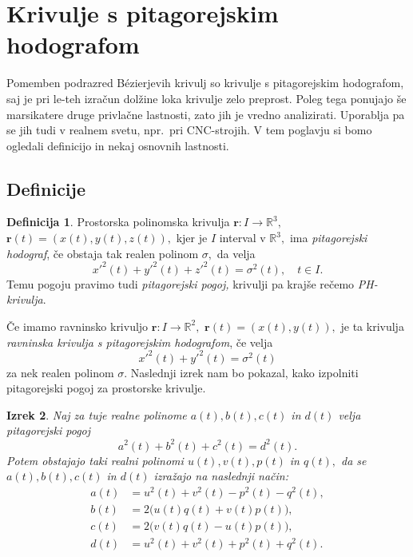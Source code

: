 \documentclass[12pt,a4paper,twoside]{article}
\theoremstyle{definition} %
\newtheorem{definicija}{Definicija}[section]
\theoremstyle{plain} %
\newtheorem{izrek}[definicija]{Izrek}
\theoremstyle{primerstyle}
\numberwithin{equation}{section}  %
\newcommand{\R}{\mathbb R}
\newcommand{\rV}{\mathbf{r}}
\begin{document}
\section{Krivulje s pitagorejskim hodografom}

Pomemben podrazred Bézierjevih krivulj so krivulje s pitagorejskim hodografom, saj je pri le-teh izračun dolžine loka krivulje zelo preprost. Poleg tega ponujajo še marsikatere druge privlačne lastnosti, zato jih je vredno analizirati. Uporablja pa se jih tudi v realnem svetu, npr.\ pri CNC-strojih. V tem poglavju si bomo ogledali definicijo in nekaj osnovnih lastnosti.

\subsection{Definicije}

\begin{definicija}
	Prostorska polinomska krivulja $\rV:I \to \R^3,$ $\rV(t)=(x(t),y(t),z(t)),$ kjer je $I$ interval v $\R^3,$ ima \emph{pitagorejski hodograf}, če obstaja tak realen polinom $\sigma,$ da velja
	\begin{equation}
		\label{pitagorejski}
		x'^2(t)+y'^2(t)+z'^2(t)=\sigma^2(t),\quad t\in I.
	\end{equation}
	Temu pogoju pravimo tudi \emph{pitagorejski pogoj,} krivulji pa krajše rečemo \emph{PH-krivulja}.
\end{definicija}

Če imamo ravninsko krivuljo $\rV:I \to \R^2,$ $\rV(t)=(x(t),y(t)),$ je ta krivulja \emph{ravninska krivulja s pitagorejskim hodografom}, če velja
\begin{equation}
	\label{ravninski_pitagorejski}
	x'^2(t)+y'^2(t)=\sigma^2(t)
\end{equation}
za nek realen polinom $\sigma.$ Naslednji izrek nam bo pokazal, kako izpolniti pitagorejski pogoj za prostorske krivulje.
\begin{izrek}
	\label{PH_pogoj_izrek}
	Naj za tuje realne polinome $a(t),b(t),c(t)$ in $d(t)$ velja pitagorejski pogoj
	\begin{equation}
		\label{pogoj_izrek4_2}
		a^2(t)+b^2(t)+c^2(t)=d^2(t).
	\end{equation}
	Potem obstajajo taki realni polinomi $u(t),v(t),p(t)$ in $q(t),$ da se $a(t),b(t),c(t)$ in $d(t)$ izražajo na naslednji način:
	\begin{align}
		a(t)&=u^2(t)+v^2(t)-p^2(t)-q^2(t), \nonumber \\
		b(t)&=2\big(u(t)q(t)+v(t)p(t)\big), \label{izrek4_3} \\
		c(t)&=2\big(v(t)q(t)-u(t)p(t)\big), \nonumber \\
		d(t)&=u^2(t)+v^2(t)+p^2(t)+q^2(t). \nonumber
	\end{align}
\end{izrek}
\end{document}
